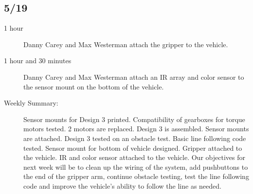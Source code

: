 \documentclass[11pt]{report}
\begin{document}
\begin{adjustwidth}{0.5cm}{0cm}
\vspace{-2.1em}\subsection*{5/19}
\begin{greylineformat}
\begin{description}
    \item [1 hour] Danny Carey and Max Westerman attach the gripper to the vehicle. 
    \item [1 hour and 30 minutes] Danny Carey and Max Westerman attach an \gls{IR} array and color sensor to the sensor mount on the bottom of the vehicle. 
\end{description}\end{greylineformat}

\newpage
\begin{description}
    \item [Weekly Summary:]Sensor mounts for Design 3 printed. Compatibility of gearboxes for torque motors tested. 2 motors are replaced. Design 3 is assembled. Sensor mounts are attached. Design 3 tested on an obstacle test. Basic line following code tested. Sensor mount for bottom of vehicle designed. Gripper attached to the vehicle. \gls{IR} and color sensor attached to the vehicle. Our objectives for next week will be to clean up the wiring of the system, add pushbuttons to the end of the gripper arm, continue obstacle testing, test the line following code and improve the vehicle’s ability to follow the line as needed.
\end{description}\vspace{0.5em}
\end{adjustwidth}
\end{document}
